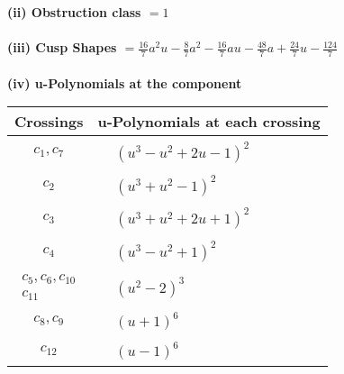 \documentclass[1p]{elsarticle_modified}
\theoremstyle{definition}
\begin{document}
\flushleft \textbf{(ii) Obstruction class $= 1$}\\~\\
\flushleft \textbf{(iii) Cusp Shapes $= \frac{16}{7} a^2 u-\frac{8}{7} a^2-\frac{16}{7} a u-\frac{48}{7} a+\frac{24}{7} u-\frac{124}{7}$}\\~\\
\newpage\renewcommand{\arraystretch}{1}
\flushleft \textbf{(iv) u-Polynomials at the component}\newline \\
\begin{tabular}{m{50pt}|m{274pt}}
Crossings & \hspace{64pt}u-Polynomials at each crossing \\
\hline $$\begin{aligned}c_{1},c_{7}\end{aligned}$$&$\begin{aligned}
&(u^3- u^2+2 u-1)^2
\end{aligned}$\\
\hline $$\begin{aligned}c_{2}\end{aligned}$$&$\begin{aligned}
&(u^3+u^2-1)^2
\end{aligned}$\\
\hline $$\begin{aligned}c_{3}\end{aligned}$$&$\begin{aligned}
&(u^3+u^2+2 u+1)^2
\end{aligned}$\\
\hline $$\begin{aligned}c_{4}\end{aligned}$$&$\begin{aligned}
&(u^3- u^2+1)^2
\end{aligned}$\\
\hline $$\begin{aligned}c_{5},c_{6},c_{10}\\c_{11}\end{aligned}$$&$\begin{aligned}
&(u^2-2)^3
\end{aligned}$\\
\hline $$\begin{aligned}c_{8},c_{9}\end{aligned}$$&$\begin{aligned}
&(u+1)^6
\end{aligned}$\\
\hline $$\begin{aligned}c_{12}\end{aligned}$$&$\begin{aligned}
&(u-1)^6
\end{aligned}$\\
\hline
\end{tabular}\\~\\
\end{document}

